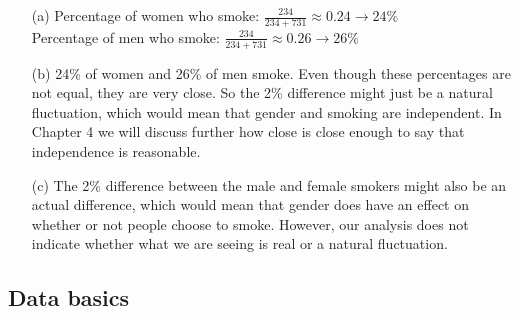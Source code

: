 {
{
\begin{enumerate}
\item[(a)] Percentage of women who smoke: $\frac{234}{234+731} \approx 0.24 \rightarrow 24\%$ \\
Percentage of men who smoke: $\frac{234}{234+731} \approx 0.26 \rightarrow 26\%$
\item[(b)] 24\% of women and 26\% of men smoke. Even though these percentages are not equal, they are very close. So the 2\% difference might just be a natural fluctuation, which would mean that gender and smoking are independent. In Chapter 4 we will discuss further how close is close enough to say that independence is reasonable.
\item[(c)] The 2\% difference between the male and female smokers might also be an actual difference, which would mean that gender does have an effect on whether or not people choose to smoke. However, our analysis does not indicate whether what we are seeing is real or a natural fluctuation.
\end{enumerate}
}\label{UKSmoking_maleFemaleSmoker}
}


\subsection{Data basics}

